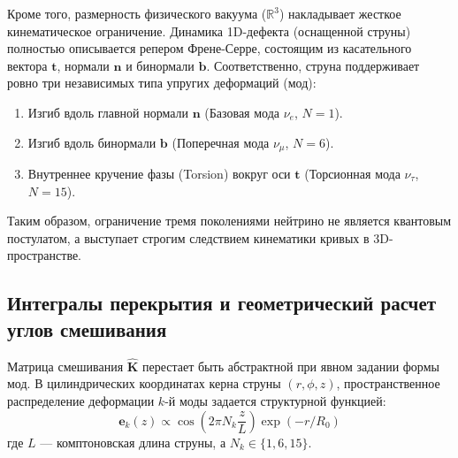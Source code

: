 \documentclass[12pt,a4paper]{article}
\begin{document}
	Кроме того, размерность физического вакуума ($\mathbb{R}^3$) накладывает жесткое кинематическое ограничение. Динамика 1D-дефекта (оснащенной струны) полностью описывается репером Френе-Серре, состоящим из касательного вектора $\mathbf{t}$, нормали $\mathbf{n}$ и бинормали $\mathbf{b}$. Соответственно, струна поддерживает ровно три независимых типа упругих деформаций (мод):
	\begin{enumerate}
		\item Изгиб вдоль главной нормали $\mathbf{n}$ (Базовая мода $\nu_e$, $N=1$).
		\item Изгиб вдоль бинормали $\mathbf{b}$ (Поперечная мода $\nu_\mu$, $N=6$).
		\item Внутреннее кручение фазы (Torsion) вокруг оси $\mathbf{t}$ (Торсионная мода $\nu_\tau$, $N=15$).
	\end{enumerate}
	Таким образом, ограничение тремя поколениями нейтрино не является квантовым постулатом, а выступает строгим следствием кинематики кривых в 3D-пространстве.
	
	\subsection{Интегралы перекрытия и геометрический расчет углов смешивания}
	Матрица смешивания $\hat{\mathbf{K}}$ перестает быть абстрактной при явном задании формы мод. В цилиндрических координатах керна струны $(r, \phi, z)$, пространственное распределение деформации $k$-й моды задается структурной функцией:
	\begin{equation}
		\mathbf{e}_k(z) \propto \cos\left(2\pi N_k \frac{z}{L}\right) \exp(-r/R_0)
	\end{equation}
	где $L$ — комптоновская длина струны, а $N_k \in \{1, 6, 15\}$.
	
\end{document}
